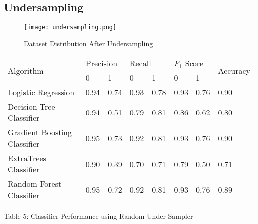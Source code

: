 \documentclass[12pt,letter-paper]{article}
\begin{document}
    \subsection{Undersampling}
    
        \begin{figure}[H]%
            \begin{center}
                \texttt{[image: undersampling.png]}%
                    \caption{Dataset Distribution After Undersampling}  
            \end{center}
        \end{figure}
        
        \begin{table}[H]
    \begin{center}
        \begin{tabular}{|l|l|l|l|l|l|l|l|}
            \hline
            \multirow{2}{*}{Algorithm} & \multicolumn{2}{l|}{Precision} & \multicolumn{2}{l|}{Recall} & \multicolumn{2}{l|}{$F_1$ Score} & \multirow{2}{*}{Accuracy} \\ \cline{2-7}
                               & 0              & 1             & 0            & 1            & 0             & 1             &                           \\ \hline
        Logistic Regression         & 0.94           & 0.74          & 0.93         & 0.78         & 0.93          & 0.76          & 0.90                     \\ \hline
        Decision Tree Classifier         & 0.94           & 0.51          & 0.79         & 0.81         & 0.86          & 0.62          & 0.80                      \\ \hline
        Gradient Boosting Classifier & 0.95           & 0.73          & 0.92         & 0.81         & 0.93          & 0.76          & 0.90                      \\ \hline
        ExtraTrees Classifier       & 0.90           & 0.39          & 0.70         & 0.71         & 0.79          & 0.50          & 0.71                      \\ \hline
        Random Forest Classifier     & 0.95           & 0.72          & 0.92         & 0.81         & 0.93          & 0.76          & 0.89                      \\ \hline
        \end{tabular}
    \end{center}
    \begin{center}
    Table 5: Classifier Performance using Random Under Sampler
        \end{center}
    \end{table}
    
\end{document}
